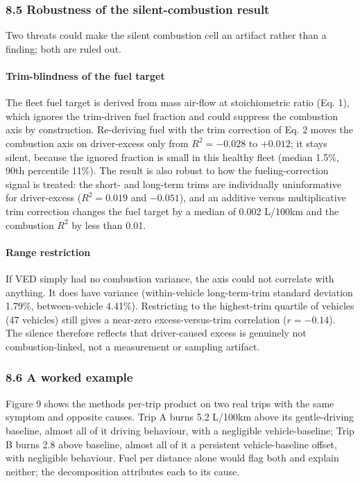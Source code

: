 \subsubsection{8.5 Robustness of the silent-combustion
result}\label{robustness-of-the-silent-combustion-result}

Two threats could make the silent combustion cell an artifact rather
than a finding; both are ruled out.

\paragraph{Trim-blindness of the fuel
target}\label{trim-blindness-of-the-fuel-target}

The fleet fuel target is derived from mass air-flow at stoichiometric
ratio (Eq. 1), which ignores the trim-driven fuel fraction and could
suppress the combustion axis by construction. Re-deriving fuel with the
trim correction of Eq. 2 moves the combustion axis on driver-excess only
from \(R^2 = -0.028\) to \(+0.012\); it stays silent, because the
ignored fraction is small in this healthy fleet (median 1.5\%, 90th
percentile 11\%). The result is also robust to how the
fueling-correction signal is treated: the short- and long-term trims are
individually uninformative for driver-excess (\(R^2 = 0.019\) and
\(-0.051\)), and an additive versus multiplicative trim correction
changes the fuel target by a median of 0.002 L/100km and the combustion
\(R^2\) by less than 0.01.

\paragraph{Range restriction}\label{range-restriction}

If VED simply had no combustion variance, the axis could not correlate
with anything. It does have variance (within-vehicle long-term-trim
standard deviation 1.79\%, between-vehicle 4.41\%). Restricting to the
highest-trim quartile of vehicles (47 vehicles) still gives a near-zero
excess-versus-trim correlation (\(r = -0.14\)). The silence therefore
reflects that driver-caused excess is genuinely not combustion-linked,
not a measurement or sampling artifact.

\subsubsection{8.6 A worked example}\label{a-worked-example}

Figure 9 shows the method\textquotesingle s per-trip product on two real
trips with the same symptom and opposite causes. Trip A burns 5.2
L/100km above its gentle-driving baseline, almost all of it driving
behaviour, with a negligible vehicle-baseline; Trip B burns 2.8 above
baseline, almost all of it a persistent vehicle-baseline offset, with
negligible behaviour. Fuel per distance alone would flag both and
explain neither; the decomposition attributes each to its cause.

